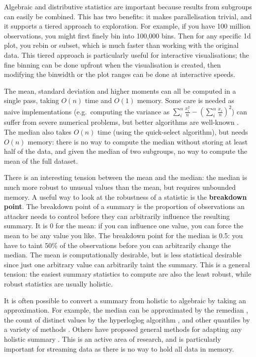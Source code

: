 \documentclass[journal]{vgtc}                %
\begin{document}
Algebraic and distributive statistics are important because results from subgroups can easily be combined. This has two benefits: it makes parallelisation trivial, and it supports a tiered approach to exploration. For example, if you have 100 million observations, you might first finely bin into 100,000 bins. Then for any specific 1d plot, you rebin or subset, which is much faster than working with the original data. This tiered approach is particularly useful for interactive visualisations; the fine binning can be done upfront when the visualisation is created, then modifying the binwidth or the plot ranges can be done at interactive speeds.

The mean, standard deviation and higher moments can all be computed in a single pass, taking $O(n)$ time and $O(1)$ memory. Some care is needed as naive implementations (e.g.\ computing the variance as $\sum_i^n \frac{x_i^2}{n} - \left( \sum_i^n \frac{x_i}{n} \right)^2$) can suffer from severe numerical problems, but better algorithms are well-known \citep{welford:1962}. The median also takes $O(n)$ time (using the quick-select algorithm), but needs $O(n)$ memory: there is no way to compute the median without storing at least half of the data, and given the median of two subgroups, no way to compute the mean of the full dataset.

There is an interesting tension between the mean and the median: the median is much more robust to unusual values than the mean, but requires unbounded memory. A useful way to look at the robustness of a statistic is the {\bf breakdown point}. The breakdown point of a summary is the proportion of observations an attacker needs to control before they can arbitrarily influence the resulting summary. It is 0 for the mean: if you can influence one value, you can force the mean to be any value you like. The breakdown point for the median is 0.5: you have to taint 50\% of the observations before you can arbitrarily change the median. The mean is computationally desirable, but is less statistical desirable since just one arbitrary value can arbitrarily taint the summary.  This is a general tension: the easiest summary statistics to compute are also the least robust, while robust statistics are usually holistic.

It is often possible to convert a summary from holistic to algebraic by taking an approximation. For example, the median can be approximated by the remedian \citep{rousseeuw:1990}, the count of distinct values by the hyperloglog  algorithm \citep{flajolet:2007}, and other quantiles by a variety of methods \citep{finkelstein:1994,hurley:1995,liechty:2003}. Others have proposed general methods for adapting any holistic summary \citep{christmann:2007}. This is an active area of research, and is particularly important for streaming data as there is no way to hold all data in memory.  
\end{document}
